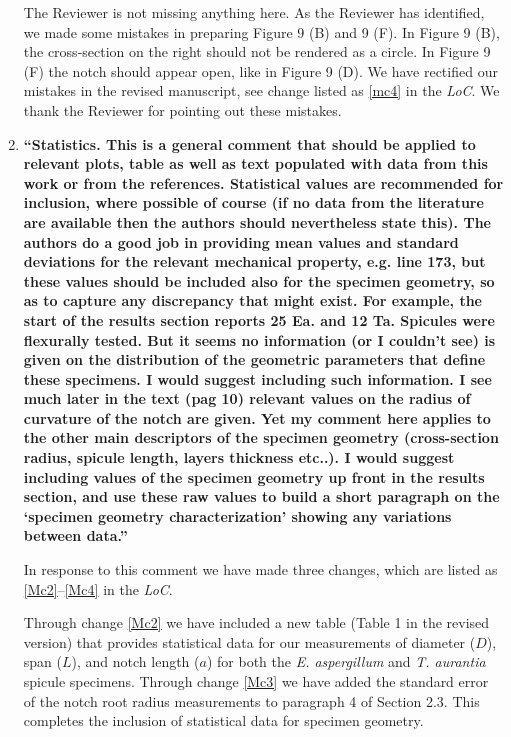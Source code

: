 \documentclass[11pt,letterpaper]{report}
\begin{document}
\begin{enumerate}[label=\textit{2.\arabic*},wide, labelwidth=!, labelindent=0pt]
The Reviewer is not missing anything here. As the Reviewer has identified, we made some mistakes in preparing Figure 9 (B) and 9 (F). In Figure 9 (B), the cross-section on the right should not be rendered as a circle. In Figure 9 (F) the notch should appear open, like in Figure 9 (D). We have rectified our mistakes in the revised manuscript, see change listed as \ref{mc4} in the \textit{LoC}. We thank the Reviewer for pointing out these mistakes. 

\item \label{r2c7} {\bf ``Statistics. This is a general comment that should be applied to relevant plots, table as well as text populated with data from this work or from the references. Statistical values are recommended for inclusion, where possible of course (if no data from the literature are available then the authors should nevertheless state this). The authors do a good job in providing mean values and standard deviations for the relevant mechanical property, e.g. line 173, but these values should be included also for the specimen geometry, so as to capture any discrepancy that might exist. For example, the start of the results section reports 25 Ea. and 12 Ta. Spicules were flexurally tested. But it seems no information (or I couldn't see) is given on the distribution of the geometric parameters that define these specimens. I would suggest including such information. I see much later in the text (pag 10) relevant values on the radius of curvature of the notch are given. Yet my comment here applies to the other main descriptors of the specimen geometry (cross-section radius, spicule length, layers thickness etc..). I would suggest including values of the specimen geometry up front in the results section, and use these raw values to build a short paragraph on the `specimen geometry characterization' showing any variations between data.''}

In response to this comment we have made three changes, which are listed as \ref{Mc2}--\ref{Mc4} in the \textit{LoC}.
%

Through change \ref{Mc2} we have included a new table (Table 1 in the revised version) that provides statistical data for our measurements of diameter ($D$), span ($L$), and notch length ($a$) for both the \textit{E. aspergillum} and \textit{T. aurantia} spicule specimens.
%
Through change \ref{Mc3} we have added the standard error of the notch root radius measurements to paragraph 4 of Section 2.3. This completes the inclusion of statistical data for specimen geometry.
%


\end{enumerate}
\end{document}
